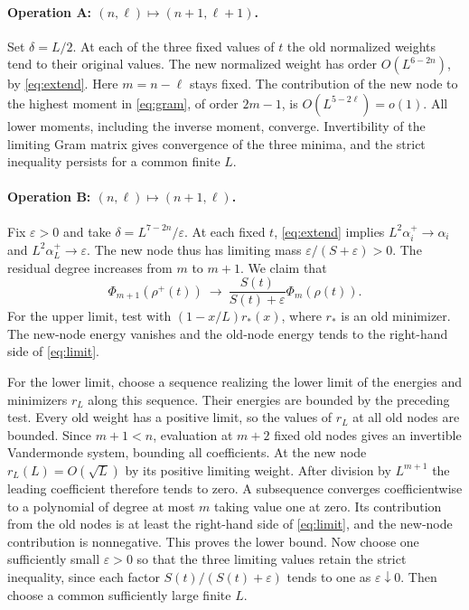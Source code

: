 \documentclass[11pt,a4paper]{article}
\begin{document}
\paragraph{Operation A: \((n,\ell)\mapsto(n+1,\ell+1)\).}
Set \(\delta=L/2\). At each of the three fixed values of \(t\) the old
normalized weights tend to their original values. The new normalized
weight has order \(O(L^{6-2n})\), by \eqref{eq:extend}. Here \(m=n-\ell\)
stays fixed. The contribution of the new node to the highest moment
in \eqref{eq:gram}, of order \(2m-1\), is \(O(L^{5-2\ell})=o(1)\).
All lower moments, including the inverse moment, converge. Invertibility
of the limiting Gram matrix gives convergence of the three minima, and the
strict inequality persists for a common finite \(L\).

\paragraph{Operation B: \((n,\ell)\mapsto(n+1,\ell)\).}
Fix \(\varepsilon>0\) and take \(\delta=L^{7-2n}/\varepsilon\).
At each fixed \(t\), \eqref{eq:extend} implies
\(L^2\alpha_i^+\to\alpha_i\) and \(L^2\alpha_L^+\to\varepsilon\). The new
node thus has limiting mass \(\varepsilon/(S+\varepsilon)>0\). The residual
degree increases from \(m\) to \(m+1\). We claim that
\begin{equation}\label{eq:limit}
 \Phi_{m+1}(\rho^+(t))\ \longrightarrow\
 \frac{S(t)}{S(t)+\varepsilon}\Phi_m(\rho(t)).
\end{equation}
For the upper limit, test with \((1-x/L)r_*(x)\), where \(r_*\) is an old
minimizer. The new-node energy vanishes and the old-node energy tends to
the right-hand side of \eqref{eq:limit}.

For the lower limit, choose a sequence realizing the lower limit of the
energies and minimizers \(r_L\) along this sequence. Their energies are
bounded by the preceding test. Every old weight has a positive limit, so the
values of \(r_L\) at all old nodes are bounded. Since \(m+1<n\), evaluation
at \(m+2\) fixed old nodes gives an invertible Vandermonde system, bounding
all coefficients. At the new node \(r_L(L)=O(\sqrt L)\) by its positive
limiting weight. After division by \(L^{m+1}\) the leading coefficient
therefore tends to zero. A subsequence converges coefficientwise to a
polynomial of degree at most \(m\) taking value one at zero. Its contribution
from the old nodes is at least the right-hand side of \eqref{eq:limit},
and the new-node contribution is nonnegative. This proves the lower bound.
Now choose one sufficiently small \(\varepsilon>0\) so that the three
limiting values retain the strict inequality, since each factor
\(S(t)/(S(t)+\varepsilon)\) tends to one as \(\varepsilon\downarrow0\).
Then choose a common sufficiently large finite \(L\).
\end{document}
